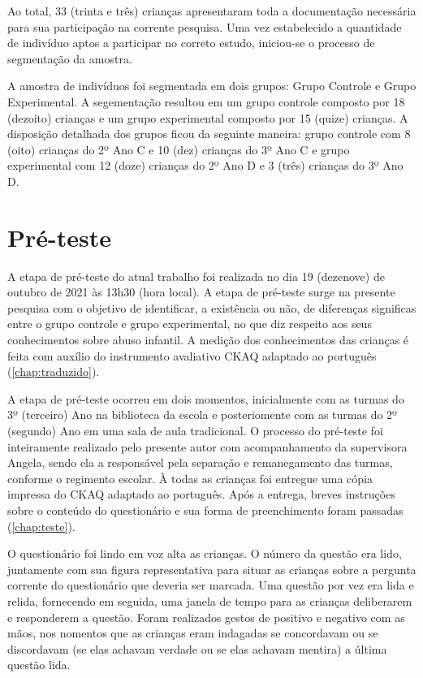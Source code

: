 Ao total, 33 (trinta e três) crianças apresentaram toda a documentação necessária para sua participação na corrente pesquisa. Uma vez estabelecido a quantidade de indivíduo aptos a participar no correto estudo, iniciou-se o processo de segmentação da amostra. 

A amostra de indivíduos foi segmentada em dois grupos: Grupo Controle e Grupo Experimental. A segementação resultou em um grupo controle composto por 18 (dezoito) crianças e um grupo experimental composto por 15 (quize) crianças. A disposição detalhada dos grupos ficou da seguinte maneira: grupo controle com 8 (oito) crianças do 2º Ano C e 10 (dez) crianças do 3º Ano C e grupo experimental com 12 (doze) crianças do 2º Ano D e 3 (três) crianças do 3º Ano D.


\section{Pré-teste}\label{sec:pretes}

A etapa de pré-teste do atual trabalho foi realizada no dia 19 (dezenove) de outubro de 2021 às 13h30 (hora local). A etapa de pré-teste surge na presente pesquisa com o objetivo de identificar, a existência ou não, de diferenças significas entre o grupo controle e grupo experimental, no que diz respeito aos seus conhecimentos sobre abuso infantil. A medição dos conhecimentos das crianças é feita com auxílio do instrumento avaliativo \acf{CKAQ} adaptado ao português (\autoref{chap:traduzido}). 

A etapa de pré-teste ocorreu em dois momentos, inicialmente com as turmas do 3º (terceiro) Ano na biblioteca da escola e posteriomente com as turmas do 2º (segundo) Ano em uma sala de aula tradicional. O processo do pré-teste foi inteiramente realizado pelo presente autor com acompanhamento da supervisora Angela, sendo ela a responsável pela separação e remanegamento das turmas, conforme o regimento escolar. À todas as crianças foi entregue uma cópia impressa do \ac{CKAQ} adaptado ao português. Após a entrega, breves instruções sobre o conteúdo do questionário e sua forma de preenchimento foram passadas (\autoref{chap:teste}). %

O questionário foi lindo em voz alta as crianças. O número da questão era lido, juntamente com sua figura representativa para situar as crianças sobre a pergunta corrente do questionário que deveria ser marcada. Uma questão por vez era lida e relida, fornecendo em seguida, uma janela de tempo para as crianças deliberarem e responderem a questão. Foram realizados gestos de positivo e negativo com as mãos, nos nomentos que as crianças eram indagadas se concordavam ou se discordavam (se elas achavam verdade ou se elas achavam mentira) a última questão lida.

